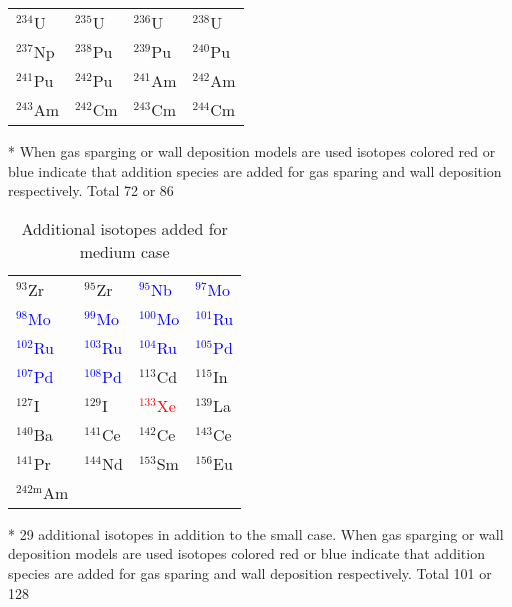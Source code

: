 \begin{table}[htbp]
\begin{threeparttable}
\begin{tabular}{C{3cm}C{3cm}C{3cm}C{3cm}}
    ${}^{234}$U & ${}^{235}$U & ${}^{236}$U & ${}^{238}$U \\  
    ${}^{237}$Np & ${}^{238}$Pu & ${}^{239}$Pu & ${}^{240}$Pu \\
    ${}^{241}$Pu & ${}^{242}$Pu & ${}^{241}$Am & ${}^{242}$Am \\
    ${}^{243}$Am & ${}^{242}$Cm & ${}^{243}$Cm & ${}^{244}$Cm \\
    \hline
    \end{tabular}
    \begin{tablenotes}\footnotesize
    \item[*] When gas sparging or wall deposition models are used isotopes colored red or blue indicate that addition species are added for gas sparing and wall deposition respectively. Total 72 or 86 
    
   \end{tablenotes}
   \end{threeparttable}
\end{table}

\begin{table}[htbp]
    \caption{\label{tab:medium_nuclides} Additional isotopes added for medium case}
    \centering
    \begin{threeparttable}
    \begin{tabular}{C{3cm}C{3cm}C{3cm}C{3cm}}
    \hline
    ${}^{93}$Zr & ${}^{95}$Zr & \textcolor{blue}{${}^{95}$Nb} & \textcolor{blue}{${}^{97}$Mo} \\
    \textcolor{blue}{${}^{98}$Mo} & \textcolor{blue}{${}^{99}$Mo} & \textcolor{blue}{${}^{100}$Mo} & \textcolor{blue}{${}^{101}$Ru} \\
    \textcolor{blue}{${}^{102}$Ru} & \textcolor{blue}{${}^{103}$Ru} & \textcolor{blue}{${}^{104}$Ru} & \textcolor{blue}{${}^{105}$Pd} \\
    \textcolor{blue}{${}^{107}$Pd} & \textcolor{blue}{${}^{108}$Pd} & ${}^{113}$Cd & ${}^{115}$In \\
    ${}^{127}$I & ${}^{129}$I & \textcolor{red}{${}^{133}$Xe} & ${}^{139}$La \\
    ${}^{140}$Ba & ${}^{141}$Ce & ${}^{142}$Ce & ${}^{143}$Ce \\
    ${}^{141}$Pr & ${}^{144}$Nd & ${}^{153}$Sm & ${}^{156}$Eu \\
    ${}^{242\text{m}}$Am & ${}^{}$ & ${}^{}$ & ${}^{}$ \\
    \hline
    \end{tabular}
    \begin{tablenotes}\footnotesize
    \item[*] 29 additional isotopes in addition to the small case. When gas sparging or wall deposition models are used isotopes colored red or blue indicate that addition species are added for gas sparing and wall deposition respectively. Total 101 or 128
    
   \end{tablenotes}
   \end{threeparttable}
\end{table}

